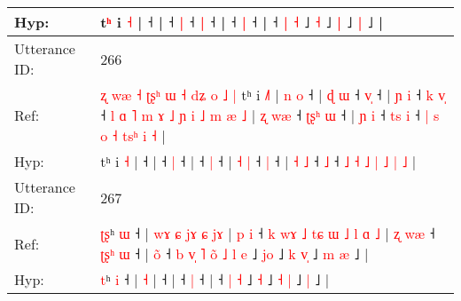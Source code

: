 \documentclass[10pt]{article}
\DeclareRobustCommand{\hl}[1]{{\textcolor{red}{#1}}}
\begin{document}
\begin{longtable}{ll}
 \\
Hyp: & \hl{}\hl{}\hl{}\hl{}\hl{}\hl{}\hl{}\hl{}\hl{}\hl{}\hl{}\hl{}\hl{}\hl{}\hl{}\hl{}\hl{}\hl{}\hl{}\hl{}\hl{}\hl{}\hl{}\hl{}\hl{}\hl{}t\hl{ʰ} i \hl{˧} |\hl{}\hl{}\hl{}\hl{}\hl{} ˧\hl{} |\hl{}\hl{}\hl{}\hl{} ˧\hl{}\hl{} \hl{|} ˧\hl{}\hl{}\hl{} \hl{}\hl{|} ˧\hl{}\hl{}\hl{}\hl{}\hl{}\hl{} |\hl{}\hl{} ˧\hl{}\hl{} \hl{|} ˧\hl{}\hl{}\hl{}\hl{}\hl{}\hl{}\hl{}\hl{}\hl{}\hl{}\hl{}\hl{} |\hl{}\hl{}\hl{}\hl{}\hl{}\hl{}\hl{} ˧ \hl{}\hl{|} \hl{˧} ˩\hl{}\hl{} \hl{}\hl{˧} ˩\hl{}\hl{}\hl{}\hl{} \hl{|} ˩\hl{}\hl{}\hl{} \hl{|} ˩ |
 \\
\midrule
Utterance ID: & 266 \\
Ref: & \hl{ʐ}\hl{ }\hl{w}\hl{æ}\hl{ }\hl{˧}\hl{ }\hl{ʈ}\hl{ʂ}\hl{ʰ}\hl{ }\hl{ɯ}\hl{ }\hl{˧}\hl{ }\hl{d}\hl{ʑ}\hl{ }\hl{o}\hl{ }\hl{˩}\hl{ }\hl{|}\hl{ }tʰ i \hl{˩}\hl{˥} |\hl{ }\hl{n}\hl{ }\hl{o} ˧ |\hl{ }\hl{ɖ}\hl{ }\hl{ɯ} ˧ \hl{v}\hl{̩} ˧ |\hl{ }\hl{ɲ}\hl{ }\hl{i} ˧\hl{ }\hl{k} \hl{v}\hl{̩} ˧\hl{ }\hl{l}\hl{ }\hl{ɑ}\hl{ }\hl{˥}\hl{ }\hl{m}\hl{ }\hl{ɤ}\hl{ }\hl{˩}\hl{ }\hl{ɲ}\hl{ }\hl{i}\hl{ }\hl{˩}\hl{ }\hl{m}\hl{ }\hl{æ}\hl{ }\hl{˩} | \hl{ʐ} \hl{w}\hl{æ} ˧\hl{ }\hl{ʈ}\hl{ʂ}\hl{ʰ} \hl{ɯ} ˧ | \hl{ɲ} \hl{i} ˧\hl{ }\hl{t}\hl{s} \hl{i} ˧ \hl{|} \hl{s} \hl{o} \hl{˧} \hl{t}\hl{s}\hl{ʰ} \hl{i} \hl{˧} |
 \\
Hyp: & \hl{}\hl{}\hl{}\hl{}\hl{}\hl{}\hl{}\hl{}\hl{}\hl{}\hl{}\hl{}\hl{}\hl{}\hl{}\hl{}\hl{}\hl{}\hl{}\hl{}\hl{}\hl{}\hl{}\hl{}tʰ i \hl{}\hl{˧} |\hl{}\hl{}\hl{}\hl{} ˧ |\hl{}\hl{}\hl{}\hl{} ˧ \hl{}\hl{|} ˧ |\hl{}\hl{}\hl{}\hl{} ˧\hl{}\hl{} \hl{}\hl{|} ˧\hl{}\hl{}\hl{}\hl{}\hl{}\hl{}\hl{}\hl{}\hl{}\hl{}\hl{}\hl{}\hl{}\hl{}\hl{}\hl{}\hl{}\hl{}\hl{}\hl{}\hl{}\hl{}\hl{}\hl{} | \hl{˧} \hl{}\hl{|} ˧\hl{}\hl{}\hl{}\hl{} \hl{|} ˧ | \hl{˧} \hl{˩} ˧\hl{}\hl{}\hl{} \hl{˩} ˧ \hl{˩} \hl{˧} \hl{˩} \hl{|} \hl{}\hl{}\hl{˩} \hl{|} \hl{˩} |
 \\
\midrule
Utterance ID: & 267 \\
Ref: & \hl{ʈ}\hl{ʂ}ʰ \hl{ɯ} ˧ |\hl{ }\hl{w}\hl{ɤ}\hl{ }\hl{ɕ}\hl{ }\hl{j}\hl{ɤ}\hl{ }\hl{ɕ} \hl{j}\hl{ɤ} |\hl{ }\hl{p}\hl{ }\hl{i} ˧\hl{ }\hl{k}\hl{ }\hl{w}\hl{ɤ}\hl{ }\hl{˩}\hl{ }\hl{t}\hl{ɕ}\hl{ }\hl{ɯ}\hl{ }\hl{˩}\hl{ }\hl{l}\hl{ }\hl{ɑ}\hl{ }\hl{˩} |\hl{ }\hl{ʐ}\hl{ }\hl{w}\hl{æ} ˧\hl{ }\hl{ʈ}\hl{ʂ}\hl{ʰ} \hl{ɯ} ˧ |\hl{ }\hl{o}\hl{̃} ˧\hl{ }\hl{b}\hl{ }\hl{v}\hl{̩}\hl{ }\hl{˥}\hl{ }\hl{o}\hl{̃}\hl{ }\hl{˩} \hl{l} \hl{e} ˩ \hl{j}\hl{o} ˩ \hl{k} \hl{v}\hl{̩} ˩\hl{ }\hl{m} \hl{æ} ˩ |
 \\
Hyp: & \hl{}\hl{t}ʰ \hl{i} ˧ |\hl{}\hl{}\hl{}\hl{}\hl{}\hl{}\hl{}\hl{}\hl{}\hl{} \hl{}\hl{˧} |\hl{}\hl{}\hl{}\hl{} ˧\hl{}\hl{}\hl{}\hl{}\hl{}\hl{}\hl{}\hl{}\hl{}\hl{}\hl{}\hl{}\hl{}\hl{}\hl{}\hl{}\hl{}\hl{}\hl{}\hl{} |\hl{}\hl{}\hl{}\hl{}\hl{} ˧\hl{}\hl{}\hl{}\hl{} \hl{|} ˧ |\hl{}\hl{}\hl{} ˧\hl{}\hl{}\hl{}\hl{}\hl{}\hl{}\hl{}\hl{}\hl{}\hl{}\hl{}\hl{} \hl{|} \hl{˧} ˩ \hl{}\hl{˧} ˩ \hl{˧} \hl{}\hl{|} ˩\hl{}\hl{} \hl{|} ˩ |

\end{longtable}
\end{document}
